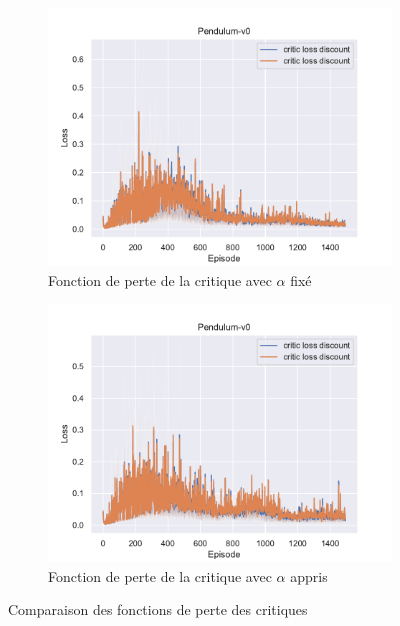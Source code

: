 \begin{figure}[H]
    \centering
    \begin{subfigure}{0.45\textwidth}
        \includegraphics[width=\textwidth]{figures/sac_itr4/a_fixed/critic_loss_Pendulum-v0_pg_dataset_td_trajs_1500_update_threshold_1000_nb_updates_20_gamma_0.98_tau_0.01_nstep_5_lr_act_0.0005_lr_critic_0.001_init_alpha_0.02_lr_alpha_0.0_target_entropy_alpha_-1.0pg.pdf}
        \caption{Fonction de perte de la critique avec \(\alpha\) fixé}
    \end{subfigure}
    \begin{subfigure}{0.45\textwidth}
        \includegraphics[width=\textwidth]{figures/sac_itr4/a_learned/critic_loss_Pendulum-v0_pg_dataset_td_trajs_1500_update_threshold_1000_nb_updates_20_gamma_0.98_tau_0.01_nstep_5_lr_act_0.0005_lr_critic_0.001_init_alpha_0.02_lr_alpha_0.001_target_entropy_alpha_-1.0pg.pdf}
        \caption{Fonction de perte de la critique avec \(\alpha\) appris}
    \end{subfigure}
    \caption{Comparaison des fonctions de perte des critiques}\label{fig:sac:critics_loss4}
\end{figure}


